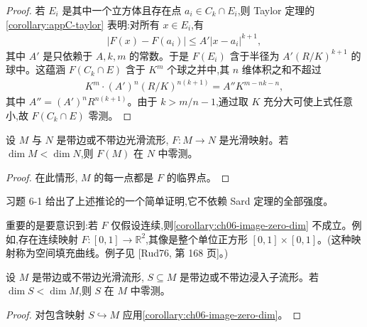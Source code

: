 \documentclass[../../main.tex]{subfiles}
\begin{document}
\begin{proof}
若 $E_i$ 是其中一个立方体且存在点 $a_i\in C_k\cap E_i$,则 Taylor 定理的\cref{corollary:appC-taylor} 表明:对所有 $x\in E_i$,有
\begin{align}\label{align:ch06-taylor-bound}
|F(x)-F(a_i)|\leqslant A'|x-a_i|^{k+1},
\end{align}
其中 $A'$ 是只依赖于 $A,k,m$ 的常数。于是 $F(E_i)$ 含于半径为 $A'(R/K)^{k+1}$ 的球中。这蕴涵 $F(C_k\cap E)$ 含于 $K^m$ 个球之并中,其 $n$ 维体积之和不超过
\begin{align}\label{align:ch06-volume-bound}
K^m\cdot(A')^n(R/K)^{n(k+1)}=A''K^{m-nk-n},
\end{align}
其中 $A''=(A')^nR^{n(k+1)}$。由于 $k>m/n-1$,通过取 $K$ 充分大可使上式任意小,故 $F(C_k\cap E)$ 零测。
\end{proof}

\begin{corollary}\label{corollary:ch06-image-zero-dim}
设 $M$ 与 $N$ 是带边或不带边光滑流形, $F:M\to N$ 是光滑映射。若 $\dim M<\dim N$,则 $F(M)$ 在 $N$ 中零测。
\end{corollary}

\begin{proof}
在此情形, $M$ 的每一点都是 $F$ 的临界点。
\end{proof}

习题 6-1 给出了上述推论的一个简单证明,它不依赖 Sard 定理的全部强度。

重要的是要意识到:若 $F$ 仅假设连续,则\cref{corollary:ch06-image-zero-dim} 不成立。例如,存在连续映射 $F:[0,1]\to\mathbb{R}^2$,其像是整个单位正方形 $[0,1]\times[0,1]$。(这种映射称为空间填充曲线。例子见 [Rud76, 第 168 页]。)

\begin{corollary}\label{corollary:ch06-immersed-submanifold-zero}
设 $M$ 是带边或不带边光滑流形, $S\subseteq M$ 是带边或不带边浸入子流形。若 $\dim S<\dim M$,则 $S$ 在 $M$ 中零测。
\end{corollary}

\begin{proof}
对包含映射 $S\hookrightarrow M$ 应用\cref{corollary:ch06-image-zero-dim}。
\end{proof}
\end{document}
